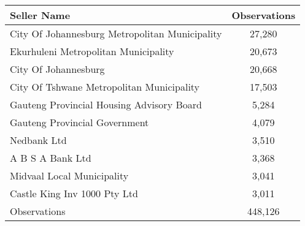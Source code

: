 \begin{tabu}{lc}
\toprule
 Seller Name & Observations \\
\midrule
City Of Johannesburg Metropolitan Municipality & 27,280  \\
Ekurhuleni Metropolitan Municipality & 20,673  \\
City Of Johannesburg & 20,668  \\
City Of Tshwane Metropolitan Municipality & 17,503  \\
Gauteng Provincial Housing Advisory Board & 5,284  \\
Gauteng Provincial Government & 4,079  \\
Nedbank Ltd & 3,510  \\
A B S A Bank Ltd & 3,368  \\
Midvaal Local Municipality & 3,041  \\
Castle King Inv 1000 Pty Ltd & 3,011  \\
\midrule
Observations & 448,126  \\
\bottomrule
\end{tabu}
